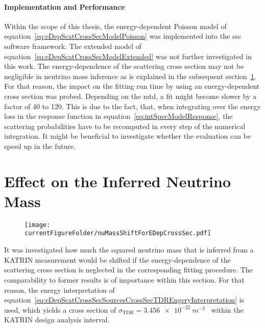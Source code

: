 \paragraph{Implementation and Performance}
Within the scope of this thesis, the energy-dependent Poisson model of equation~\eqref{eq:eDepScatCrossSecModelPoisson} was implemented into the \gls{ssc} software framework. The extended model of equation~\eqref{eq:eDepScatCrossSecModelExtended} was not further investigated in this work. The energy-dependence of the scattering cross section may not be negligible in neutrino mass inference as is explained in the subsequent section~\ref{sec:eDepScatCrossSecNuMassInf}. For that reason, the impact on the fitting run time by using an energy-dependent cross section was probed. Depending on the \gls{mtd}, a fit might become slower by a factor of 40 to 120. This is due to the fact, that, when integrating over the energy loss in the response function in equation~\eqref{eq:intSpecModelResponse}, the scattering probabilities have to be recomputed in every step of the numerical integration. It might be beneficial to investigate whether the evaluation can be speed up in the future.


\section{Effect on the Inferred Neutrino Mass}
\label{sec:eDepScatCrossSecNuMassInf}
\begin{figure}[t]
\texttt{[image: \\currentFigureFolder/nuMassShiftForEDepCrossSec.pdf]}
        \label{fig:eDepScatCrossSecNuMassInfShifts}
\end{figure}
It was investigated how much the squared neutrino mass that is inferred from a KATRIN measurement would be shifted if the energy-dependence of the scattering cross section is neglected in the corresponding fitting procedure. The comparability to former results is of importance within this section. For that reason, the energy interpretation of equation~\ref{eq:eDepScatCrossSecSourcesCrossSecTDREngeryInterpretation} is used, which yields a cross section of $\sigma_\mathrm{TDR}=\SI{3.456e-22}{m^{-2}}$~\cite{Angrik:2005ep} within the KATRIN design analysis interval.

